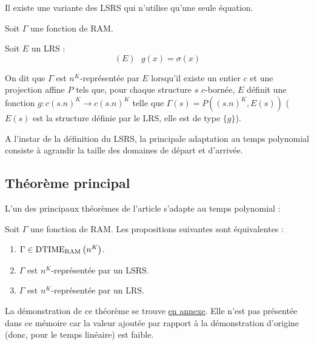 		Il existe une variante des LSRS qui n'utilise qu'une seule équation.
		
		
		\begin{definition}
			\label{def:representee_par_LRS}
			Soit $\Gamma$ une fonction de RAM. 
			
			Soit $E$ un LRS :
			\[
			(E) \ \ \ g(x) = \sigma(x)
			\]
			
			On dit que $\Gamma$ est $n^K$-représentée par $E$ lorsqu'il existe un entier $c$ et une projection affine $P$ tels que, pour chaque structure $s$ $c$-bornée, $E$ définit une fonction $g : c (s.n)^K \to c (s.n)^K$ telle que $\Gamma(s) = P\left((s.n)^K, E(s)\right)$ ($E(s)$ est la structure définie par le LRS, elle est de type $\{g\}$).
		\end{definition}
		
		A l'instar de la définition du LSRS, la principale adaptation au temps polynomial consiste à agrandir la taille des domaines de départ et d'arrivée.
		
		\subsection{Théorème principal}
		\label{sec:theorem_principal_grandjean_schwentick}
		
		L'un des principaux théorèmes de l'article \cite{GrandjeanSchwentick2002} s'adapte au temps polynomial :
		
		\begin{conj}
			\label{conj:main_big_theorem}
			Soit $\Gamma$ une fonction de RAM. Les propositions suivantes sont équivalentes :
			
			\begin{enumerate}[itemsep=-1mm]
				\item 	\label{num:main_gamma_in_nk}
				$\Gamma \in \text{DTIME}_{\text{RAM}}\left( n^{K} \right)$.
				
				\item 	\label{num:main_gamma_nk_rep_LSRS}
				$\Gamma$ est $n^K$-représentée par un LSRS.
				
				\item	\label{num:main_gamma_nk_rep_LRS}
				$\Gamma$ est $n^K$-représentée par un LRS.
			\end{enumerate}
		\end{conj}
		
		La démonstration de ce théorème se trouve \hyperref[sec:LRS_et_temps_poly]{en annexe}. Elle n'est pas présentée dans ce mémoire car la valeur ajoutée par rapport à la démonstration d'origine (donc, pour le temps linéaire) est faible. 
		
